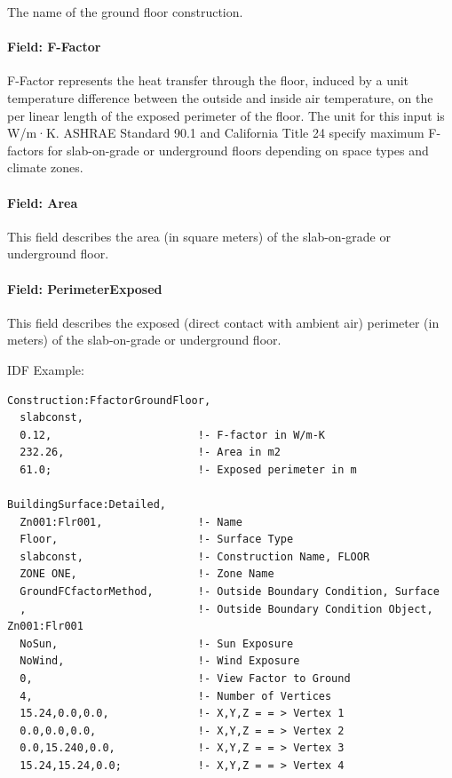 The name of the ground floor construction.

\paragraph{Field: F-Factor}\label{field-f-factor}

F-Factor represents the heat transfer through the floor, induced by a unit temperature difference between the outside and inside air temperature, on the per linear length of the exposed perimeter of the floor. The unit for this input is W/m·K. ASHRAE Standard 90.1 and California Title 24 specify maximum F-factors for slab-on-grade or underground floors depending on space types and climate zones.

\paragraph{Field: Area}\label{field-area}

This field describes the area (in square meters) of the slab-on-grade or underground floor.

\paragraph{Field: PerimeterExposed}\label{field-perimeterexposed}

This field describes the exposed (direct contact with ambient air) perimeter (in meters) of the slab-on-grade or underground floor.

IDF Example:

\begin{lstlisting}
Construction:FfactorGroundFloor,
  slabconst,
  0.12,                       !- F-factor in W/m-K
  232.26,                     !- Area in m2
  61.0;                       !- Exposed perimeter in m

BuildingSurface:Detailed,
  Zn001:Flr001,               !- Name
  Floor,                      !- Surface Type
  slabconst,                  !- Construction Name, FLOOR
  ZONE ONE,                   !- Zone Name
  GroundFCfactorMethod,       !- Outside Boundary Condition, Surface
  ,                           !- Outside Boundary Condition Object, Zn001:Flr001
  NoSun,                      !- Sun Exposure
  NoWind,                     !- Wind Exposure
  0,                          !- View Factor to Ground
  4,                          !- Number of Vertices
  15.24,0.0,0.0,              !- X,Y,Z = = > Vertex 1
  0.0,0.0,0.0,                !- X,Y,Z = = > Vertex 2
  0.0,15.240,0.0,             !- X,Y,Z = = > Vertex 3
  15.24,15.24,0.0;            !- X,Y,Z = = > Vertex 4
\end{lstlisting}

